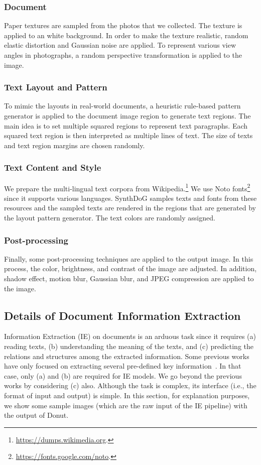 \documentclass[runningheads]{llncs}
\begin{document}
\subsubsection{Document}
Paper textures are sampled from the photos that we collected. The texture is applied to an white background. In order to make the texture realistic, random elastic distortion and Gaussian noise are applied. To represent various view angles in photographs, a random perspective transformation is applied to the image.

\subsubsection{Text Layout and Pattern}
To mimic the layouts in real-world documents, a heuristic rule-based pattern generator is applied to the document image region to generate text regions. The main idea is to set multiple squared regions to represent text paragraphs. 
Each squared text region is then interpreted as multiple lines of text. The size of texts and text region margins are chosen randomly.


\subsubsection{Text Content and Style}
We prepare the multi-lingual text corpora from Wikipedia.\footnote{\url{https://dumps.wikimedia.org}.}
We use Noto fonts\footnote{\url{https://fonts.google.com/noto}.} since it supports various languages. SynthDoG samples texts and fonts from these resources and the sampled texts are rendered in the regions that are generated by the layout pattern generator. The text colors are randomly assigned.

\subsubsection{Post-processing}
Finally, some post-processing techniques are applied to the output image. In this process, the color, brightness, and contrast of the image are adjusted. In addition, shadow effect, motion blur, Gaussian blur, and JPEG compression are applied to the image.



\subsection{Details of Document Information Extraction} Information Extraction (IE) on documents is an arduous task since it requires (a) reading texts, (b) understanding the meaning of the texts, and (c) predicting the relations and structures among the extracted information. Some previous works have only focused on extracting several pre-defined key information~\cite{eaten}. In that case, only (a) and (b) are required for IE models. We go beyond the previous works by considering (c) also. Although the task is complex, its interface (i.e., the format of input and output) is simple. 
In this section, for explanation purposes, we show some sample images (which are the raw input of the IE pipeline) with the output of Donut.
\end{document}
